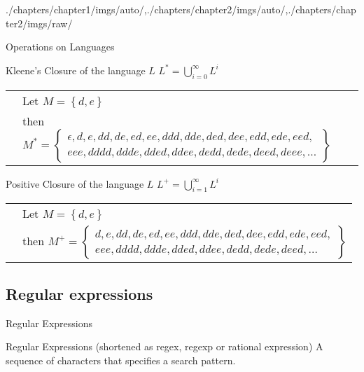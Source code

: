 \begin{graphicspathcontext}{{./chapters/chapter1/imgs/auto/},{./chapters/chapter2/imgs/auto/},{./chapters/chapter2/imgs/raw/}}
\begin{bibunit}[apalike]
\begin{frame}[c]{Operations on Languages \insertcontinuationtext}
	\begin{block}{Kleene's Closure of the language $L$}
		$L^* = \bigcup^{\infty}_{i=0}L^i$
		\begin{tabularx}{\linewidth}{@{}lX@{}}
		\insertexamplelabel & Let $M = \left\{ d, e \right\}$ \\
		& then $M^* = \left\{ \begin{array}{l}
			\scriptstyle \epsilon, d, e, dd, de, ed, ee, ddd, dde, ded, dee, edd, ede, eed, \\
			\scriptstyle eee, dddd, ddde, dded, ddee, dedd, dede, deed, deee, \dots\end{array} \right\}$
		\end{tabularx}
	\end{block}
	\vspace{.5cm}
	\begin{block}{Positive Closure of the language $L$}
		$L^+ = \bigcup^{\infty}_{i=1}L^i$
		\begin{tabularx}{\linewidth}{@{}lX@{}}
		\insertexamplelabel & Let $M = \left\{ d, e \right\}$ \\
		& then $M^+ = \left\{ \begin{array}{l}
			\scriptstyle d, e, dd, de, ed, ee, ddd, dde, ded, dee, edd, ede, eed, \\
			\scriptstyle eee, dddd, ddde, dded, ddee, dedd, dede, deed, \dots\end{array} \right\}$
		\end{tabularx}
	\end{block}
\end{frame}

\subsection{Regular expressions}
\subsectiontableofcontentslide

\begin{frame}{Regular Expressions}
	\begin{definitionblock}{Regular Expressions (shortened as regex, regexp or rational expression)}
		A sequence of characters that specifies a search pattern.
	\end{definitionblock}
	\vspace{.5cm}
	\begin{rightarrowsequence}
	\end{rightarrowsequence}
\end{frame}


\end{bibunit}
\end{graphicspathcontext}
